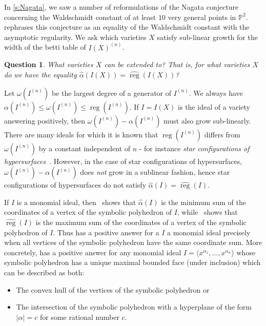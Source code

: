 \documentclass[12pt, reqno]{amsart}
\numberwithin{equation}{section}
\renewcommand{\P}{{\mathbb P}}
\DeclareMathOperator{\reg}{reg}
\theoremstyle{plain} %
\newtheorem{question}[thm]{Question}
\theoremstyle{definition}
\theoremstyle{remark}
\begin{document}
In \cref{s:Nagata}, we saw a number of reformulations of the Nagata conjecture concerning the Waldschmidt constant of at least $10$ very general points in $\P^2$.   rephrases this conjecture as an equality of the Waldschmidt constant with the asymptotic regularity.  We ask which varieties $X$ satisfy sub-linear growth for the width of the betti table of $I(X)^{(n)}$.

\begin{question}\label{ques:ExtendingAsymptoticRegularity}
What varieties $X$ can  be extended to?  That is, for what varieties $X$ do we have the equality $\widehat{\alpha}(I(X))=\widehat{\reg}(I(X))$?
\end{question}

Let $\omega(I^{(n)})$ be the largest degree of a generator of $I^{(n)}$.  We always have $\alpha(I^{(n)}) \le \omega(I^{(n)})\le \reg(I^{(n)})$.  If $I=I(X)$ is the ideal of a variety answering  positively, then $\omega(I^{(n)})-\alpha(I^{(n)})$ must also grow sub-linearly.  There are many ideals for which it is known that $\reg(I^{(n)})$ differs from $\omega(I^{(n)})$ by a constant independent of $n$ - for instance \textit{star configurations of hypersurfaces}~\cite{Mantero-2020}.  However, in the case of star configurations of hypersurfaces, $\omega(I^{(n)})-\alpha(I^{(n)})$ does \textit{not} grow in a sublinear fashion, hence star configurations of hypersurfaces do not satisfy $\widehat{\alpha}(I)=\widehat{\reg}(I)$.

If $I$ is a monomial ideal, then~\cite{CEHH} shows that $\widehat{\alpha}(I)$ is the minimum sum of the coordinates of a vertex of the symbolic polyhedron of $I$, while~\cite[Theorem~1.3]{DHNT21} shows that $\widehat{\reg}(I)$ is the maximum sum of the coordinates of a vertex of the symbolic polyhedron of $I$.  Thus  has a positive answer for a $I$ a monomial ideal precisely when all vertices of the symbolic polyhedron have the same coordinate sum.  More concretely,  has a positive answer for any monomial ideal $I=\langle x^{\alpha_1},\ldots,x^{\alpha_n}\rangle$ whose symbolic polyhedron has a unique maximal bounded face (under inclusion) which can be described as both:
\begin{itemize}
\item The convex hull of the vertices of the symbolic polyhedron or
\item The intersection of the symbolic polyhedron with a hyperplane of the form $|\alpha|=c$ for some rational number $c$.
\end{itemize}
\end{document}
